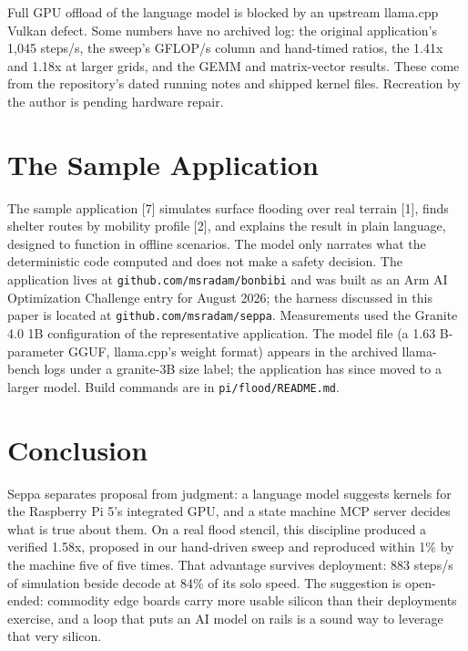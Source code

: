 \documentclass[conference]{IEEEtran}
\begin{document}
Full GPU offload of the language model is blocked by an upstream
llama.cpp Vulkan defect. Some numbers have no archived log: the original
application's 1,045 steps/s, the sweep's GFLOP/s column and hand-timed
ratios, the 1.41x and 1.18x at larger grids, and the GEMM and
matrix-vector results. These come from the repository's dated running
notes and shipped kernel files. Recreation by the author is pending
hardware repair.

\section{The Sample Application}\label{the-sample-application}

The sample application {[}7{]} simulates surface flooding over real
terrain {[}1{]}, finds shelter routes by mobility profile {[}2{]}, and
explains the result in plain language, designed to function in offline
scenarios. The model only narrates what the deterministic code computed
and does not make a safety decision. The application lives at
\texttt{github.com/msradam/bonbibi} and was built as an Arm AI
Optimization Challenge entry for August 2026; the harness discussed in
this paper is located at \texttt{github.com/msradam/seppa}. Measurements
used the Granite 4.0 1B configuration of the representative application.
The model file (a 1.63 B-parameter GGUF, llama.cpp's weight format)
appears in the archived llama-bench logs under a granite-3B size label;
the application has since moved to a larger model. Build commands are in
\texttt{pi/flood/README.md}.

\section{Conclusion}\label{conclusion}

Seppa separates proposal from judgment: a language model suggests
kernels for the Raspberry Pi 5's integrated GPU, and a state machine MCP
server decides what is true about them. On a real flood stencil, this
discipline produced a verified 1.58x, proposed in our hand-driven sweep
and reproduced within 1\% by the machine five of five times. That
advantage survives deployment: 883 steps/s of simulation beside decode
at 84\% of its solo speed. The suggestion is open-ended: commodity edge
boards carry more usable silicon than their deployments exercise, and a
loop that puts an AI model on rails is a sound way to leverage that very
silicon.
\end{document}
